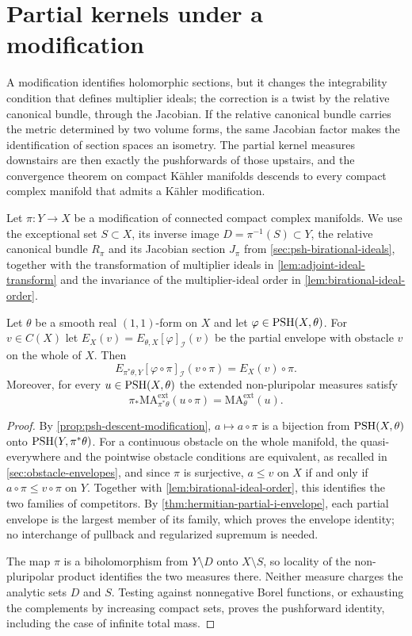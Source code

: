 \section{Partial kernels under a modification}
\label{sec:birational-partial-kernels}

A modification identifies holomorphic sections, but it changes the integrability condition that defines multiplier ideals; the correction is a twist by the relative canonical bundle, through the Jacobian. If the relative canonical bundle carries the metric determined by two volume forms, the same Jacobian factor makes the identification of section spaces an isometry. The partial kernel measures downstairs are then exactly the pushforwards of those upstairs, and the convergence theorem on compact K\"ahler manifolds descends to every compact complex manifold that admits a K\"ahler modification.

Let $\pi\colon Y\to X$ be a modification of connected compact complex manifolds. We use the exceptional set $S\subset X$, its inverse image $D=\pi^{-1}(S)\subset Y$, the relative canonical bundle $R_\pi$ and its Jacobian section $J_\pi$ from \cref{sec:psh-birational-ideals}, together with the transformation of multiplier ideals in \cref{lem:adjoint-ideal-transform} and the invariance of the multiplier-ideal order in \cref{lem:birational-ideal-order}.

\begin{proposition}\label{prop:birational-partial-envelopes}
Let $\theta$ be a smooth real $(1,1)$-form on $X$ and let $\varphi\in\mathrm{PSH}(X,\theta)$. For $v\in C(X)$ let $E_X(v)=E_{\theta,X}[\varphi]_{\mathcal I}(v)$ be the partial envelope with obstacle $v$ on the whole of $X$. Then
\[
 E_{\pi^*\theta,Y}[\varphi\circ\pi]_{\mathcal I}(v\circ\pi)
       =E_X(v)\circ\pi.
\]
Moreover, for every $u\in\mathrm{PSH}(X,\theta)$ the extended non-pluripolar measures satisfy
\[
 \pi_*\mathrm{MA}^{\mathrm{ext}}_{\pi^*\theta}(u\circ\pi)
       =\mathrm{MA}^{\mathrm{ext}}_\theta(u).
\]
\end{proposition}
\begin{proof}
By \cref{prop:psh-descent-modification}, $a\mapsto a\circ\pi$ is a bijection from $\mathrm{PSH}(X,\theta)$ onto $\mathrm{PSH}(Y,\pi^*\theta)$. For a continuous obstacle on the whole manifold, the quasi-everywhere and the pointwise obstacle conditions are equivalent, as recalled in \cref{sec:obstacle-envelopes}, and since $\pi$ is surjective, $a\leq v$ on $X$ if and only if $a\circ\pi\leq v\circ\pi$ on $Y$. Together with \cref{lem:birational-ideal-order}, this identifies the two families of competitors. By \cref{thm:hermitian-partial-i-envelope}, each partial envelope is the largest member of its family, which proves the envelope identity; no interchange of pullback and regularized supremum is needed.

The map $\pi$ is a biholomorphism from $Y\setminus D$ onto $X\setminus S$, so locality of the non-pluripolar product identifies the two measures there. Neither measure charges the analytic sets $D$ and $S$. Testing against nonnegative Borel functions, or exhausting the complements by increasing compact sets, proves the pushforward identity, including the case of infinite total mass.
\end{proof}


